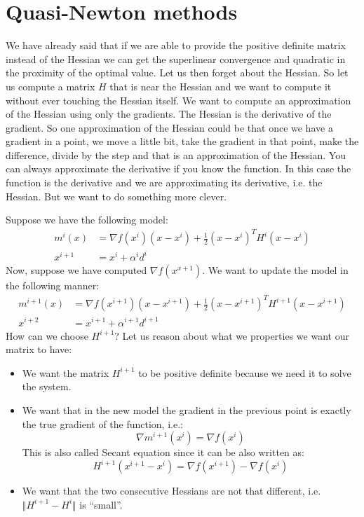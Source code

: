 \section{Quasi-Newton methods}
\par We have already said that if we are able to provide the positive definite matrix instead of the Hessian we can get the superlinear convergence and quadratic in the proximity of the optimal value. Let us then forget about the Hessian. So let us compute a matrix $H$ that is near the Hessian and we want to compute it without ever touching the Hessian itself. We want to compute an approximation of the Hessian using only the gradients. The Hessian is the derivative of the gradient. So one approximation of the Hessian could be that once we have a gradient in a point, we move a little bit, take the gradient in that point, make the difference, divide by the step and that is an approximation of the Hessian. You can always approximate the derivative if you know the function. In this case the function is the derivative and we are approximating its derivative, i.e. the Hessian. But we want to do something more clever.
\par Suppose we have the following model:
\begin{align}
    m^i(x) &= \nabla f(x^i) (x - x^i) + \frac{1}{2} (x - x^i)^T H^i (x - x^i)\\
    x^{i+1} &= x^i + \alpha^i d^i
\end{align}
Now, suppose we have computed $\nabla f(x^{x+1})$. We want to update the model in the following manner:
\begin{align}
    m^{i+1}(x) &= \nabla f(x^{i+1}) (x - x^{i+1}) + \frac{1}{2} (x - x^{i+1})^T H^{i+1} (x - x^{i+1})\\
    x^{i+2} &= x^{i+1} + \alpha^{i+1} d^{i+1}
\end{align}
How can we choose $H^{i+1}$? Let us reason about what we properties we want our matrix to have:
\begin{itemize}
    \item We want the matrix $H^{i+1}$ to be positive definite because we need it to solve the system.
    \item We want that in the new model the gradient in the previous point is exactly the true gradient of the function, i.e.:
    \begin{equation}
        \nabla m^{i+1}(x^i) = \nabla f (x^i)
    \end{equation}
    This is also called Secant equation since it can be also written as:
    \begin{equation}
        H^{i+1} (x^{i+1} - x^i) = \nabla f(x^{i+1}) - \nabla f(x^i)
    \end{equation}
    \item We want that the two consecutive Hessians are not that different, i.e. $\Vert H^{i+1} - H^i \Vert$ is ``small''.
\end{itemize}
